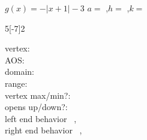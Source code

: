 \myWideProblemWithContent
{
    $g(x) =  -|x +1| - 3$
    \hfill 
    ${a} =$ ,\quad ${h} =$ ,\quad ${k} =$ 
    \tcblower 
    \begin{minipage}{0.35\textwidth}
        \centering
        \begin{myTikzpictureGrid}{0.4} {5}[-7]{2}
        \end{myTikzpictureGrid}
    \end{minipage}
    \begin{minipage}{0.65\textwidth}
        \vspace{0.5\baselineskip}
        vertex:~\dotfill{}\\[0.5\baselineskip]
        AOS:~\dotfill{}\\[0.5\baselineskip]
        domain:~\dotfill{}\\[0.5\baselineskip]
        range:~\dotfill{}\\[0.5\baselineskip]
        vertex max/min?:~\dotfill{}\\[0.5\baselineskip]
        opens up/down?:~\dotfill{}\\[0.5\baselineskip]
        left end behavior~\dotfill{} , \\[0.5\baselineskip]
        right end behavior~\dotfill{} , 
    \end{minipage}
    \vspace{0.25\baselineskip}
}

